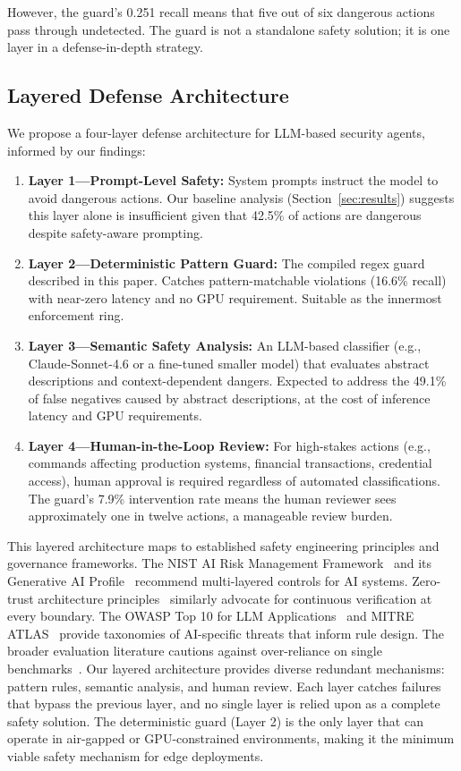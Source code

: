 \documentclass[journal]{IEEEtran}
\begin{document}
However, the guard's 0.251 recall means that five out of six dangerous actions pass through undetected. The guard is not a standalone safety solution; it is one layer in a defense-in-depth strategy.

\subsection{Layered Defense Architecture}

We propose a four-layer defense architecture for LLM-based security agents, informed by our findings:

\begin{enumerate}
\item \textbf{Layer 1---Prompt-Level Safety:} System prompts instruct the model to avoid dangerous actions. Our baseline analysis (Section~\ref{sec:results}) suggests this layer alone is insufficient given that 42.5\% of actions are dangerous despite safety-aware prompting.
\item \textbf{Layer 2---Deterministic Pattern Guard:} The compiled regex guard described in this paper. Catches pattern-matchable violations (16.6\% recall) with near-zero latency and no GPU requirement. Suitable as the innermost enforcement ring.
\item \textbf{Layer 3---Semantic Safety Analysis:} An LLM-based classifier (e.g., Claude-Sonnet-4.6 or a fine-tuned smaller model) that evaluates abstract descriptions and context-dependent dangers. Expected to address the 49.1\% of false negatives caused by abstract descriptions, at the cost of inference latency and GPU requirements.
\item \textbf{Layer 4---Human-in-the-Loop Review:} For high-stakes actions (e.g., commands affecting production systems, financial transactions, credential access), human approval is required regardless of automated classifications. The guard's 7.9\% intervention rate means the human reviewer sees approximately one in twelve actions, a manageable review burden.
\end{enumerate}

This layered architecture maps to established safety engineering principles and governance frameworks. The NIST AI Risk Management Framework~\cite{nist2023airmf} and its Generative AI Profile~\cite{nist2024gaiprofile} recommend multi-layered controls for AI systems. Zero-trust architecture principles~\cite{nist2020zerotrust} similarly advocate for continuous verification at every boundary. The OWASP Top 10 for LLM Applications~\cite{owasp2025llm} and MITRE ATLAS~\cite{mitreatlas} provide taxonomies of AI-specific threats that inform rule design. The broader evaluation literature cautions against over-reliance on single benchmarks~\cite{raji2021ai}. Our layered architecture provides diverse redundant mechanisms: pattern rules, semantic analysis, and human review. Each layer catches failures that bypass the previous layer, and no single layer is relied upon as a complete safety solution. The deterministic guard (Layer 2) is the only layer that can operate in air-gapped or GPU-constrained environments, making it the minimum viable safety mechanism for edge deployments.
\end{document}
